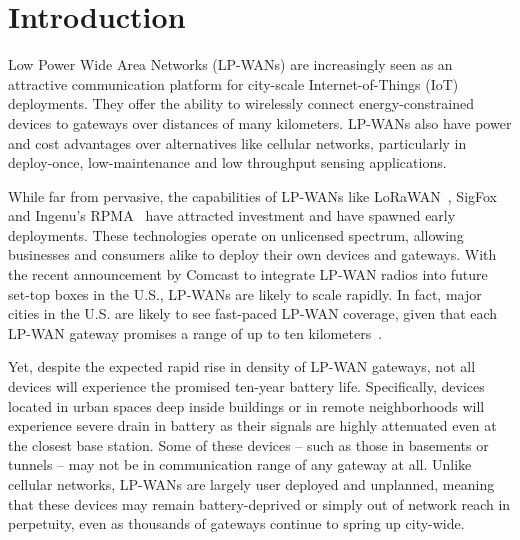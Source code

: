 
\section{Introduction}
\label{sec:intro}

Low Power Wide Area Networks (LP-WANs) are increasingly seen as an attractive
communication platform for city-scale Internet-of-Things (IoT) deployments.
They offer the ability to wirelessly connect energy-constrained devices to
gateways over distances of many kilometers. LP-WANs also have power and cost
advantages over alternatives like cellular networks, particularly in
deploy-once, low-maintenance and low throughput sensing applications.

While far from pervasive, the capabilities of LP-WANs like
LoRaWAN~\cite{Sornin2015, LoRaWanAlliance2015}, SigFox~\cite{centenaro2016}
and Ingenu's RPMA~\cite{Ingenu2015} have attracted investment and have spawned
early deployments. These technologies operate on unlicensed spectrum, allowing
businesses and consumers alike to deploy their own devices and gateways. With
the recent announcement by Comcast \cite{comcast, comcast2} to integrate
LP-WAN radios into future set-top boxes in the U.S., LP-WANs are likely to
scale rapidly. In fact, major cities in the U.S. are likely to see fast-paced
LP-WAN coverage, given that each LP-WAN gateway promises a range of up to ten
kilometers~\cite{LoRaWanAlliance2015}.

Yet, despite the expected rapid rise in density of LP-WAN gateways, not all
devices will experience the promised ten-year battery life. Specifically,
devices located in urban spaces deep inside buildings or in remote
neighborhoods will experience severe drain in battery as their signals are
highly attenuated even at the closest base station. Some of these devices --
such as those in basements or tunnels -- may not be in communication range of
any gateway at all. Unlike cellular networks, LP-WANs are largely user
deployed and unplanned, meaning that these devices may remain battery-deprived
or simply out of network reach in perpetuity, even as thousands of gateways
continue to spring up city-wide.


